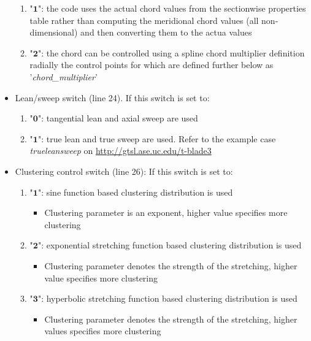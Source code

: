 \documentclass[8pt]{article}
\begin{document}
\begin{itemize}[leftmargin=*]
\begin{enumerate}[label=\alph*]
        \item "$\mathbf{1}$": the code uses the actual chord values from the sectionwise properties table rather than computing the meridional chord values (all non-dimensional) and then converting them to the actua values
        \item "$\mathbf{2}$": the chord can be controlled using a spline chord multiplier definition radially the control points for which are defined further below as '\textit{chord\_multiplier}'
    \end{enumerate}
    \item Lean/sweep switch (line 24). If this switch is set to:
    \begin{enumerate}[label=\alph*]
        \item "$\mathbf{0}$": tangential lean and axial sweep are used
        \item "$\mathbf{1}$": true lean and true sweep are used. Refer to the example case \textit{trueleansweep} on \url{http://gtsl.ase.uc.edu/t-blade3}
    \end{enumerate}
    \item Clustering control switch (line 26): If this switch is set to:
    \begin{enumerate}[label=\alph*]
        \item "$\mathbf{1}$": sine function based clustering distribution is used
        \begin{itemize}[label=\FilledSmallSquare]
            \item Clustering parameter is an exponent, higher value specifies more clustering
        \end{itemize}
        \item "$\mathbf{2}$": exponential stretching function based clustering distribution is used
        \begin{itemize}[label=\FilledSmallSquare]
            \item Clustering parameter denotes the strength of the stretching, higher value specifies more clustering
        \end{itemize}
        \item "$\mathbf{3}$": hyperbolic stretching function based clustering distribution is used
        \begin{itemize}[label=\FilledSmallSquare]
            \item Clustering parameter denotes the strength of the stretching, higher values specifies more clustering
        \end{itemize}

\end{enumerate}
\end{itemize}
\end{document}
